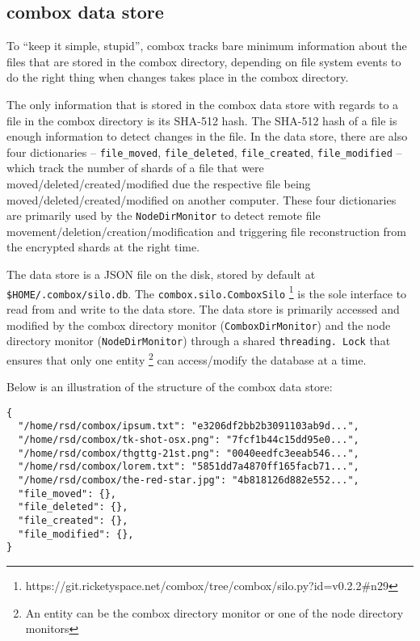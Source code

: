\subsection{combox data store}\label{sec:3-combox-db}

To ``keep it simple, stupid'', combox tracks bare minimum information
about the files that are stored in the combox directory, depending on
file system events to do the right thing when changes takes place in
the combox directory.

The only information that is stored in the combox data store with
regards to a file in the combox directory is its SHA-512 hash. The
SHA-512 hash of a file is enough information to detect changes in the
file. In the data store, there are also four dictionaries --
\verb+file_moved+, \verb+file_deleted+, \verb+file_created+,
\verb+file_modified+ -- which track the number of shards of a file
that were moved/deleted/created/modified due the respective file being
moved/deleted/created/modified on another computer. These four
dictionaries are primarily used by the \verb+NodeDirMonitor+ to detect
remote file movement/deletion/creation/modification and triggering
file reconstruction from the encrypted shards at the right time.

The data store is a JSON file on the disk, stored by default at \\
\verb+$HOME/.combox/silo.db+. The \verb+combox.silo.ComboxSilo+
\footnote{https://git.ricketyspace.net/combox/tree/combox/silo.py?id=v0.2.2\#n29}
is the sole interface to read from and write to the data store. The
data store is primarily accessed and modified by the combox directory
monitor (\verb+ComboxDirMonitor+) and the node directory monitor
(\verb+NodeDirMonitor+) through a shared \verb+threading. Lock+ that
ensures that only one entity \footnote{An entity can be the combox
  directory monitor or one of the node directory monitors} can
access/modify the database at a time.

Below is an illustration of the structure of the combox data store:

\begin{verbatim}
{
  "/home/rsd/combox/ipsum.txt": "e3206df2bb2b3091103ab9d...",
  "/home/rsd/combox/tk-shot-osx.png": "7fcf1b44c15dd95e0...",
  "/home/rsd/combox/thgttg-21st.png": "0040eedfc3eeab546...",
  "/home/rsd/combox/lorem.txt": "5851dd7a4870ff165facb71...",
  "/home/rsd/combox/the-red-star.jpg": "4b818126d882e552...",
  "file_moved": {},
  "file_deleted": {},
  "file_created": {},
  "file_modified": {},
}
\end{verbatim}

